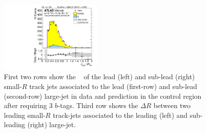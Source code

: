 \begin{figure}[htbp!]
\begin{center}
\includegraphics[width=0.45\textwidth,angle=-90]{figures/boosted/Control/b77_ThreeTag_Control_sublHCand_trk_dr.pdf}
  \caption{First two rows show the \pt~ of the lead (left) and sub-lead (right) small-$R$ track jets associated to the lead (first-row) and sub-lead (second-row) large-\R jet in data and prediction in the control region after requiring 3 $b$-tags. Third row shows the $\Delta R$ between two leading small-$R$ track-jets associated to the leading (left) and sub-leading (right) large-\R jet.  }
  \label{fig:boosted-3b-control-ak2}
\end{center}
\end{figure}



